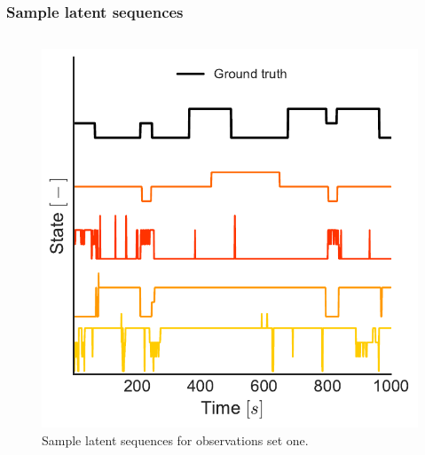 \documentclass[aspectratio=169]{beamer}
\begin{document}
    \begin{frame}
        \frametitle{Sample latent sequences}

        \begin{columns}[c] 


            \begin{figure}
                \includegraphics[width=1.0\linewidth]{state-seq-data1.pdf}
                \caption{Sample latent sequences for observations set one.}
            \end{figure}



\end{columns}
\end{frame}
\end{document}

